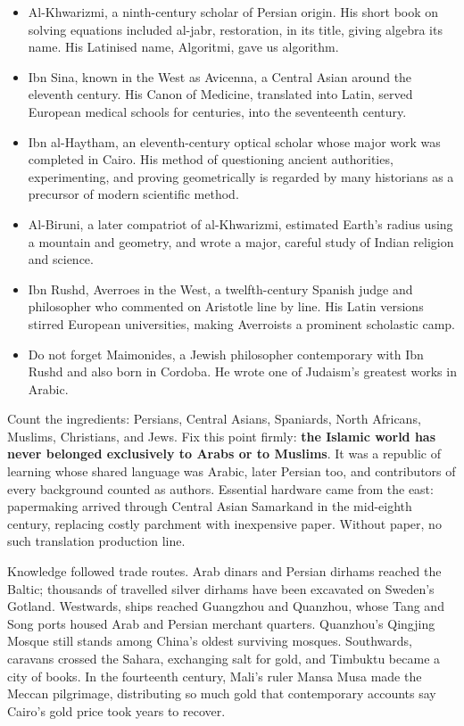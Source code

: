 \begin{itemize}
\item Al-Khwarizmi, a ninth-century scholar of Persian origin. His short book on solving equations included al-jabr, restoration, in its title, giving algebra its name. His Latinised name, Algoritmi, gave us algorithm.
\item Ibn Sina, known in the West as Avicenna, a Central Asian around the eleventh century. His Canon of Medicine, translated into Latin, served European medical schools for centuries, into the seventeenth century.
\item Ibn al-Haytham, an eleventh-century optical scholar whose major work was completed in Cairo. His method of questioning ancient authorities, experimenting, and proving geometrically is regarded by many historians as a precursor of modern scientific method.
\item Al-Biruni, a later compatriot of al-Khwarizmi, estimated Earth's radius using a mountain and geometry, and wrote a major, careful study of Indian religion and science.
\item Ibn Rushd, Averroes in the West, a twelfth-century Spanish judge and philosopher who commented on Aristotle line by line. His Latin versions stirred European universities, making Averroists a prominent scholastic camp.
\item Do not forget Maimonides, a Jewish philosopher contemporary with Ibn Rushd and also born in Cordoba. He wrote one of Judaism's greatest works in Arabic.
\end{itemize}
Count the ingredients: Persians, Central Asians, Spaniards, North Africans, Muslims, Christians, and Jews. Fix this point firmly: \textbf{the Islamic world has never belonged exclusively to Arabs or to Muslims}. It was a republic of learning whose shared language was Arabic, later Persian too, and contributors of every background counted as authors. Essential hardware came from the east: papermaking arrived through Central Asian Samarkand in the mid-eighth century, replacing costly parchment with inexpensive paper. Without paper, no such translation production line.

Knowledge followed trade routes. Arab dinars and Persian dirhams reached the Baltic; thousands of travelled silver dirhams have been excavated on Sweden's Gotland. Westwards, ships reached Guangzhou and Quanzhou, whose Tang and Song ports housed Arab and Persian merchant quarters. Quanzhou's Qingjing Mosque still stands among China's oldest surviving mosques. Southwards, caravans crossed the Sahara, exchanging salt for gold, and Timbuktu became a city of books. In the fourteenth century, Mali's ruler Mansa Musa made the Meccan pilgrimage, distributing so much gold that contemporary accounts say Cairo's gold price took years to recover.


